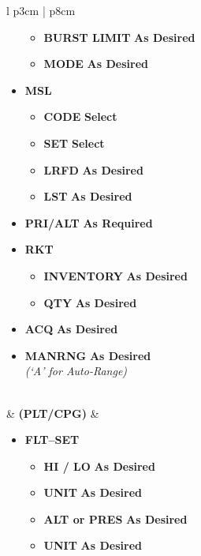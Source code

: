 \documentclass[fontHelvetica]{TechCheck}
\begin{document}
\begin{center}
\begin{longtable}{l p{3cm} | p{8cm}}
\begin{minipage}[t]{\linewidth}
\begin{itemize}
					\begin{itemize}
						\item \textbf{BURST LIMIT} \dotfill \textbf{As Desired}
						\item \textbf{MODE} \dotfill \textbf{As Desired}
					\end{itemize}
					\item \textbf{MSL}
					\begin{itemize}
						\item \textbf{CODE} \dotfill \textbf{Select}
						\item \textbf{SET} \dotfill \textbf{Select}
						\item \textbf{LRFD} \dotfill \textbf{As Desired}
						\item \textbf{LST} \dotfill \textbf{As Desired}
					\end{itemize}
					\item \textbf{PRI/ALT} \dotfill \textbf{As Required}
					\item \textbf{RKT}
					\begin{itemize}
						\item \textbf{INVENTORY} \dotfill \textbf{As Desired}
						\item \textbf{QTY} \dotfill \textbf{As Desired}
					\end{itemize}
					\item \textbf{ACQ} \dotfill \textbf{As Desired}
					\item \textbf{MANRNG} \dotfill \textbf{As Desired} \\
					\hfill \emph{(`A' for Auto-Range)}
				\end{itemize}
			\end{minipage} \\
			\midrule
			\textbf{\textbullet} &  \textbf{(PLT/CPG)} &
			\begin{minipage}[t]{\linewidth}
				\vspace{-7pt}
				\begin{itemize}
					\item \textbf{FLT--SET}
					\begin{itemize}
						\item \textbf{HI / LO} \dotfill \textbf{As Desired}
						\item \textbf{UNIT} \dotfill \textbf{As Desired}
						\item \textbf{ALT or PRES} \dotfill \textbf{As Desired}
						\item \textbf{UNIT} \dotfill \textbf{As Desired}
					\end{itemize}

\end{itemize}
\end{minipage}
\end{longtable}
\end{center}
\end{document}
